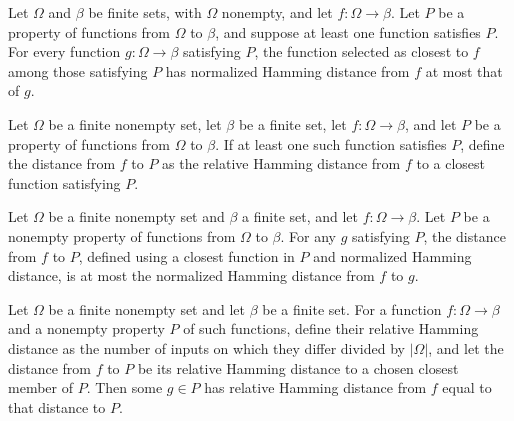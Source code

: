 \begin{theorem}
\label{FABL.closestInProperty_minimal}
\leanok
{}
Let $\Omega$ and $\beta$ be finite sets, with $\Omega$ nonempty, and let
$f\colon\Omega\to\beta$. Let $P$ be a property of functions from $\Omega$ to $\beta$,
and suppose at least one function satisfies $P$. For every function
$g\colon\Omega\to\beta$ satisfying $P$, the function selected as closest to $f$ among
those satisfying $P$ has normalized Hamming distance from $f$ at most that of $g$.
\end{theorem}

\begin{definition}
\label{FABL.distanceToProperty}
\leanok
{}
Let $\Omega$ be a finite nonempty set, let $\beta$ be a finite set, let
$f:\Omega\to\beta$, and let $P$ be a property of functions from $\Omega$ to $\beta$. If
at least one such function satisfies $P$, define the distance from $f$ to $P$ as the
relative Hamming distance from $f$ to a closest function satisfying $P$.
\end{definition}

\begin{theorem}
\label{FABL.distanceToProperty_le}
\leanok
{}
Let $\Omega$ be a finite nonempty set and $\beta$ a finite set, and let
$f:\Omega\to\beta$. Let $P$ be a nonempty property of functions from $\Omega$ to
$\beta$. For any $g$ satisfying $P$, the distance from $f$ to $P$, defined using a
closest function in $P$ and normalized Hamming distance, is at most the normalized
Hamming distance from $f$ to $g$.
\end{theorem}

\begin{theorem}
\label{FABL.exists_relativeHammingDist_eq_distanceToProperty}
\leanok
{}
Let $\Omega$ be a finite nonempty set and let $\beta$ be a finite set. For a function
$f:\Omega\to\beta$ and a nonempty property $P$ of such functions, define their relative
Hamming distance as the number of inputs on which they differ divided by $|\Omega|$, and
let the distance from $f$ to $P$ be its relative Hamming distance to a chosen closest
member of $P$. Then some $g\in P$ has relative Hamming distance from $f$ equal to that
distance to $P$.
\end{theorem}

